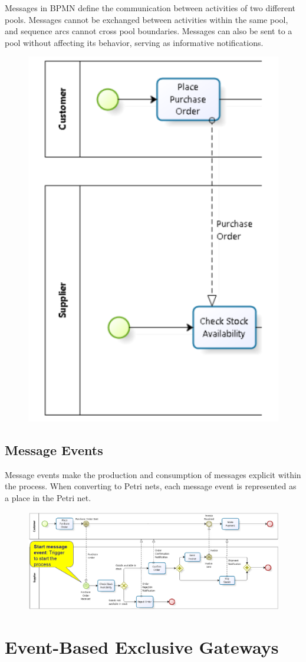Messages in BPMN define the communication between activities of two different pools. Messages cannot be exchanged between activities within the same pool, and sequence arcs cannot cross pool boundaries. Messages can also be sent to a pool without affecting its behavior, serving as informative notifications.
\begin{figure}[h!]
    \centering
    \includegraphics[width=0.5\linewidth]{capitolo 9/15.png}
\end{figure}
\subsection{Message Events}

Message events make the production and consumption of messages explicit within the process. When converting to Petri nets, each message event is represented as a place in the Petri net.
\begin{figure}[h!]
    \centering
    \includegraphics[width=0.75\linewidth]{capitolo 9/16.png}
\end{figure}
\section{Event-Based Exclusive Gateways}

